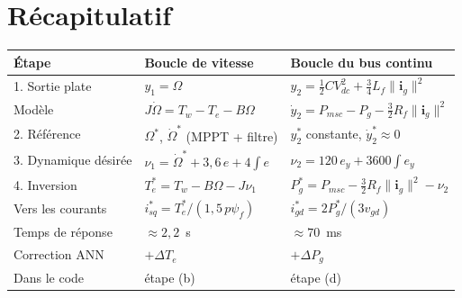 \documentclass[11pt,a4paper]{article}
\newcommand{\bv}[1]{\boldsymbol{#1}}
\begin{document}
\section{Récapitulatif}
\begin{center}
\begin{tabular}{p{3.2cm}p{6cm}p{6cm}}
\toprule
Étape & Boucle de vitesse & Boucle du bus continu\\
\midrule
1. Sortie plate & $y_1 = \Omega$ & $y_2 = \tfrac12 CV_{dc}^2 + \tfrac34 L_f\|\bv{i}_g\|^2$\\
Modèle & $J\dot\Omega = T_w - T_e - B\Omega$ & $\dot y_2 = P_{msc} - P_g - \tfrac32R_f\|\bv{i}_g\|^2$\\
2. Référence & $\Omega^*$, $\dot\Omega^*$ (MPPT + filtre) & $y_2^*$ constante, $\dot y_2^*\approx0$\\
3. Dynamique désirée & $\nu_1 = \dot\Omega^* + 3{,}6\,e + 4\!\int\!e$ & $\nu_2 = 120\,e_y + 3600\!\int\!e_y$\\
4. Inversion & $T_e^* = \hat T_w - B\Omega - J\nu_1$ & $P_g^* = P_{msc} - \tfrac32R_f\|\bv{i}_g\|^2 - \nu_2$\\
Vers les courants & $i_{sq}^* = T_e^*/(1{,}5\,p\psi_f)$ & $i_{gd}^* = 2P_g^*/(3v_{gd})$\\
Temps de réponse & $\approx 2{,}2$~s & $\approx 70$~ms\\
Correction ANN & $+\Delta T_e$ & $+\Delta P_g$\\
Dans le code & étape (b) & étape (d)\\
\bottomrule
\end{tabular}
\end{center}
\end{document}
